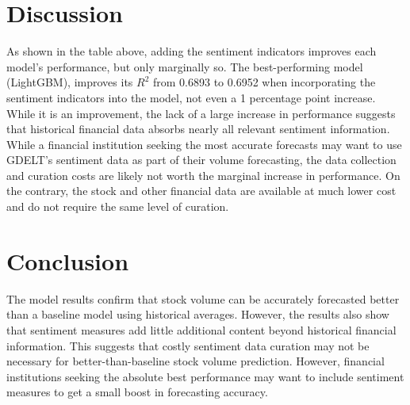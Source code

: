 \documentclass[12pt]{article}
\begin{document}


\newpage
\section{Discussion}

As shown in the table above, adding the sentiment indicators improves each model's performance, but only marginally so. The best-performing model (LightGBM), improves its $R^2$ from 0.6893 to 0.6952 when incorporating the sentiment indicators into the model, not even a 1 percentage point increase. While it is an improvement, the lack of a large increase in performance suggests that historical financial data absorbs nearly all relevant sentiment information. While a financial institution seeking the most accurate forecasts may want to use GDELT's sentiment data as part of their volume forecasting, the data collection and curation costs are likely not worth the marginal increase in performance. On the contrary, the stock and other financial data are available at much lower cost and do not require the same level of curation.

\section{Conclusion}
The model results confirm that stock volume can be accurately forecasted better than a baseline model using historical averages. However, the results also show that sentiment measures add little additional content beyond historical financial information. This suggests that costly sentiment data curation may not be necessary for better-than-baseline stock volume prediction. However, financial institutions seeking the absolute best performance may want to include sentiment measures to get a small boost in forecasting accuracy.

\newpage
\printbibliography
\end{document}
